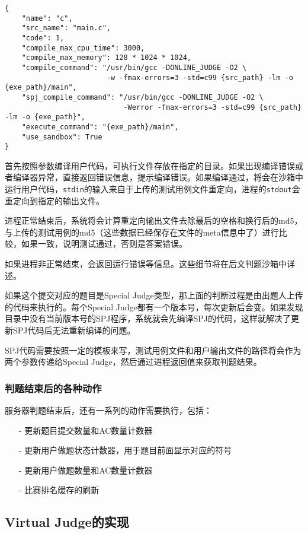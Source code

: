 \begin{verbatim}
{
    "name": "c",
    "src_name": "main.c",
    "code": 1,
    "compile_max_cpu_time": 3000,
    "compile_max_memory": 128 * 1024 * 1024,
    "compile_command": "/usr/bin/gcc -DONLINE_JUDGE -O2 \
                        -w -fmax-errors=3 -std=c99 {src_path} -lm -o {exe_path}/main",
    "spj_compile_command": "/usr/bin/gcc -DONLINE_JUDGE -O2 \
                            -Werror -fmax-errors=3 -std=c99 {src_path} -lm -o {exe_path}",
    "execute_command": "{exe_path}/main",
    "use_sandbox": True
}
\end{verbatim}

首先按照参数编译用户代码，可执行文件存放在指定的目录。如果出现编译错误或者编译器异常，直接返回错误信息，提示编译错误。如果编译通过，将会在沙箱中运行用户代码，\texttt{stdin}的输入来自于上传的测试用例文件重定向，进程的\texttt{stdout}会重定向到指定的输出文件。

进程正常结束后，系统将会计算重定向输出文件去除最后的空格和换行后的md5，与上传的测试用例的md5（这些数据已经保存在文件的meta信息中了）进行比较，如果一致，说明测试通过，否则是答案错误。

如果进程非正常结束，会返回运行错误等信息。这些细节将在后文判题沙箱中详述。

如果这个提交对应的题目是Special Judge类型，那上面的判断过程是由出题人上传的代码来执行的。每个Special Judge都有一个版本号，每次更新后会变。如果发现目录中没有当前版本号的SPJ程序，系统就会先编译SPJ的代码，这样就解决了更新SPJ代码后无法重新编译的问题。

SPJ代码需要按照一定的模板来写，测试用例文件和用户输出文件的路径将会作为两个参数传递给Special Judge，然后通过进程返回值来获取判题结果。

\subsubsection{判题结束后的各种动作}

服务器判题结束后，还有一系列的动作需要执行，包括：

\begin{itemize}
    \item[-] 更新题目提交数量和AC数量计数器
    \item[-] 更新用户做题状态计数器，用于题目前面显示对应的符号
    \item[-] 更新用户做题数量和AC数量计数器
    \item[-] 比赛排名缓存的刷新
\end{itemize}

\subsection{Virtual Judge的实现}

